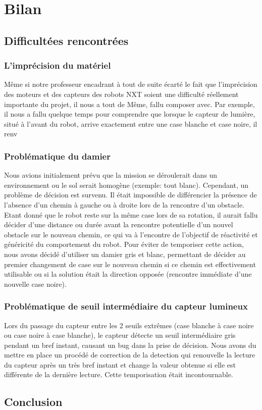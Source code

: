 \section{Bilan}

\subsection{Difficultées rencontrées}

\subsubsection{L'imprécision du matériel}

M\^{e}me si notre professeur encadrant à tout de suite écarté le fait que l'imprécision des moteurs et des capteurs des robots NXT soient une difficulté réellement importante du projet, il nous a tout de M\^{e}me, fallu composer avec. Par exemple, il nous a fallu quelque temps pour comprendre que lorsque le capteur de lumière, situé à l'avant du robot, arrive exactement entre une case blanche et case noire, il renv 

\subsubsection{Problématique du damier}

Nous avions initialement prévu que la mission se déroulerait dans un environnement ou le sol serait homogène (exemple: tout blanc). Cependant, un problème de décision est survenu. Il était impossible de différencier la présence de l'absence d'un chemin à gauche ou à droite lors de la rencontre d'un obstacle. Etant donné que le robot reste sur la même case lors de sa rotation, il aurait fallu décider d'une distance ou durée avant la rencontre potentielle d'un nouvel obstacle sur le nouveau chemin, ce qui va à l'encontre  de l'objectif de réactivité et généricité du comportement du robot. Pour éviter de temporiser cette action, nous avons décidé d'utiliser un damier gris et blanc, permettant de décider au premier changement de case sur le nouveau chemin si ce chemin est effectivement utilisable ou si la solution était la direction opposée (rencontre immédiate d'une nouvelle case noire).

\subsubsection{Problématique de seuil intermédiaire du capteur lumineux}

Lors du passage du capteur entre les 2 seuils extrêmes (case blanche à case noire ou case noire à case blanche), le capteur détecte un seuil intermédiaire gris pendant un bref instant, causant un bug dans la prise de décision. Nous avons du mettre en place un procédé de correction de la detection qui renouvelle la lecture du capteur après un très bref instant et change la valeur obtenue si elle est différente de la dernière lecture. Cette temporisation était incontournable.

\subsection{Conclusion}
